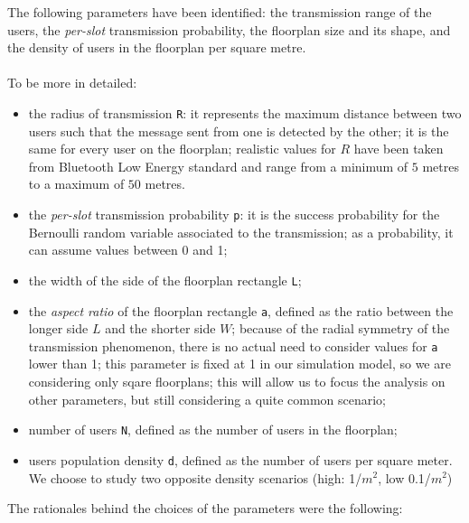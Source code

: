 The following parameters have been identified: the transmission range of the
users, the \textit{per-slot} transmission probability, the floorplan size and
its shape, and the density of users in the floorplan per square metre.\\
\\
To be more in detailed:
\begin{itemize}
	\item the radius of transmission \colorbox{gray!30}{\large \texttt{R}}: it
	represents the maximum distance between two users such that the message
	sent from one is detected by the other; it is the same for every user on
	the floorplan; realistic values for $R$ have been taken from Bluetooth Low
	Energy standard and range from a minimum of $5$ metres to a maximum of $50$
	metres.
	\item the \textit{per-slot} transmission probability
	\colorbox{gray!30}{\large \texttt{p}}: it is the success probability for the
	Bernoulli random variable associated to the transmission; as a probability, it 
	can assume values between 0 and 1;
    \item the width of the side of the floorplan rectangle
    \colorbox{gray!30}{\large \texttt{L}};
	\item the \textit{aspect ratio} of the floorplan rectangle
	\colorbox{gray!30}{\large \texttt{a}}, defined as the ratio between the
	longer side $L$ and the shorter side $W$; because of the radial symmetry of the
	transmission phenomenon, there is no actual need to consider values for
	\texttt{a} lower than 1; this parameter is fixed at 1 in our simulation model, 
	so we are considering only sqare floorplans; this will allow us to focus the analysis
	on other parameters, but still considering a quite common scenario;
	\item number of users \colorbox{gray!30}{\large \texttt{N}}, defined
	as the number of users in the floorplan;
	\item users population density \colorbox{gray!30}{\large \texttt{d}}, defined
	as the number of users per square meter. We choose to study two opposite 
	density scenarios (high: 1/$m^2$, low 0.1/$m^2$) 
\end{itemize}
The rationales behind the choices of the parameters were the following:
